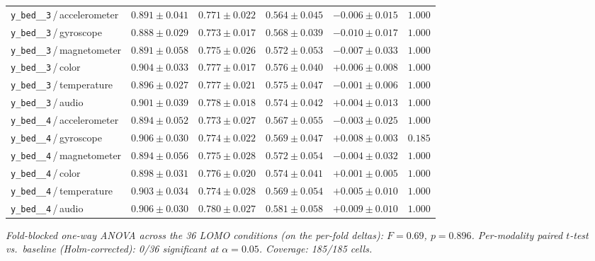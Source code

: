 \begin{table}[ht]
\begin{tabular}{l c c c c c}
\texttt{y\_bed\_\_3}\,/\,accelerometer & $0.891 \pm 0.041$ & $0.771 \pm 0.022$ & $0.564 \pm 0.045$ & $-0.006 \pm 0.015$ & $1.000$ \\
\texttt{y\_bed\_\_3}\,/\,gyroscope & $0.888 \pm 0.029$ & $0.773 \pm 0.017$ & $0.568 \pm 0.039$ & $-0.010 \pm 0.017$ & $1.000$ \\
\texttt{y\_bed\_\_3}\,/\,magnetometer & $0.891 \pm 0.058$ & $0.775 \pm 0.026$ & $0.572 \pm 0.053$ & $-0.007 \pm 0.033$ & $1.000$ \\
\texttt{y\_bed\_\_3}\,/\,color & $0.904 \pm 0.033$ & $0.777 \pm 0.017$ & $0.576 \pm 0.040$ & $+0.006 \pm 0.008$ & $1.000$ \\
\texttt{y\_bed\_\_3}\,/\,temperature & $0.896 \pm 0.027$ & $0.777 \pm 0.021$ & $0.575 \pm 0.047$ & $-0.001 \pm 0.006$ & $1.000$ \\
\texttt{y\_bed\_\_3}\,/\,audio & $0.901 \pm 0.039$ & $0.778 \pm 0.018$ & $0.574 \pm 0.042$ & $+0.004 \pm 0.013$ & $1.000$ \\
\texttt{y\_bed\_\_4}\,/\,accelerometer & $0.894 \pm 0.052$ & $0.773 \pm 0.027$ & $0.567 \pm 0.055$ & $-0.003 \pm 0.025$ & $1.000$ \\
\texttt{y\_bed\_\_4}\,/\,gyroscope & $0.906 \pm 0.030$ & $0.774 \pm 0.022$ & $0.569 \pm 0.047$ & $+0.008 \pm 0.003$ & $0.185$ \\
\texttt{y\_bed\_\_4}\,/\,magnetometer & $0.894 \pm 0.056$ & $0.775 \pm 0.028$ & $0.572 \pm 0.054$ & $-0.004 \pm 0.032$ & $1.000$ \\
\texttt{y\_bed\_\_4}\,/\,color & $0.898 \pm 0.031$ & $0.776 \pm 0.020$ & $0.574 \pm 0.041$ & $+0.001 \pm 0.005$ & $1.000$ \\
\texttt{y\_bed\_\_4}\,/\,temperature & $0.903 \pm 0.034$ & $0.774 \pm 0.028$ & $0.569 \pm 0.054$ & $+0.005 \pm 0.010$ & $1.000$ \\
\texttt{y\_bed\_\_4}\,/\,audio & $0.906 \pm 0.030$ & $0.780 \pm 0.027$ & $0.581 \pm 0.058$ & $+0.009 \pm 0.010$ & $1.000$ \\
\bottomrule
\end{tabular}
\par\smallskip
\footnotesize\textit{Fold-blocked one-way ANOVA across the 36 LOMO conditions (on the per-fold deltas): $F=0.69$, $p=0.896$. Per-modality paired $t$-test vs.\ baseline (Holm-corrected): 0/36 significant at $\alpha=0.05$. Coverage: 185/185 cells.}
\end{table}

